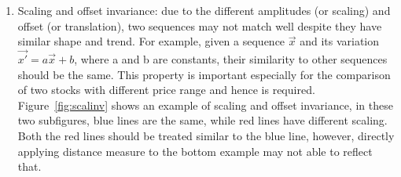 \begin{enumerate}
    \item Scaling and offset invariance: due to the different amplitudes (or scaling) and offset (or translation), two sequences may not match well despite they have similar shape and trend. For example, given a sequence $\vec{x}$ and its variation $\vec{x\prime} = a\vec{x} + b$, where a and b are constants, their similarity to other sequences should be the same. This property is important especially for the comparison of two stocks with different price range and hence is required. Figure~\ref{fig:scalinv} shows an example of scaling and offset invariance, in these two subfigures, blue lines are the same, while red lines have different scaling. Both the red lines should be treated similar to the blue line, however, directly applying distance measure to the bottom example may not able to reflect that.
    \begin{figure}[!htbp]
        \centering 


\end{figure}
\end{enumerate}
